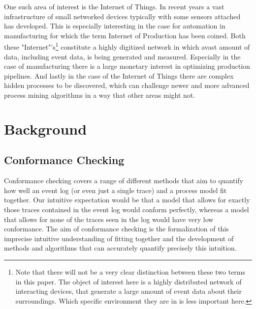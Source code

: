 \documentclass[runningheads]{template/llncs}
\begin{document}
One such area of interest is the Internet of Things.
In recent years a vast infrastructure of small networked devices typically with some sensors attached has developed. 
This is especially interesting in the case for automation in manufacturing for which the term Internet of Production has been coined.
Both these "Internet"'s\footnote{Note that there will not be a very clear distinction between these two terms in this paper. The object of interest here is a highly distributed network of interacting devices, that generate a large amount of event data about their surroundings. Which specific environment they are in is less important here.} 
constitute a highly digitized network in which avast amount of data, including event data, is being generated and measured.
Especially in the case of manufacturing there is a large monetary interest in optimizing production pipelines.
And lastly in the case of the Internet of Things there are complex hidden processes to be discovered, which can challenge newer and more advanced process mining algorithms in a way that other areas might not.
\section{Background}
\subsection{Conformance Checking}
Conformance checking covers a range of different methods that aim to quantify how well an event log (or even just a single trace) and a process model fit together.
Our intuitive expectation would be that a model that allows for exactly those traces contained in the event log would conform perfectly, whereas a model that allows for none of the traces seen in the log would have very low conformance.
The aim of conformance checking is the formalization of this imprecise intuitive understanding of fitting together and the development of methods and algorithms that can accurately quantify precisely this intuition.
\end{document}

